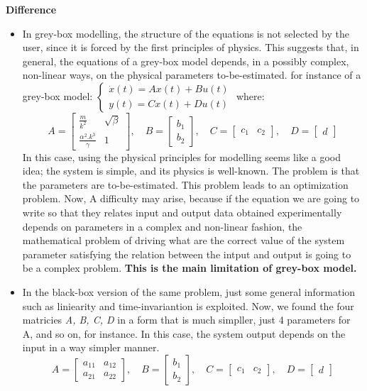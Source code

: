 \textbf{Difference} 
\begin{itemize}
\item In grey-box modelling, the structure of the equations is not selected by the user, since it is forced by the first principles of physics. This suggests that, in general, the equations of a grey-box model depends, in a possibly complex, non-linear ways, on the physical parameters to-be-estimated.\newline
for instance of a grey-box model:
$\begin{cases}
    \dot{x}(t) = A x(t) + B u(t) \\
    y(t) = C x(t) + D u(t)
\end{cases}$ where:
\newline
\[
A = \begin{bmatrix}
\frac{m}{k^2} & \sqrt{\beta} \\
\frac{\alpha^2.k^3}{\gamma} & 1  
\end{bmatrix}, \quad
B = \begin{bmatrix}
b_1 \\
b_2
\end{bmatrix}, \quad
C = \begin{bmatrix}
c_1 & c_2
\end{bmatrix}, \quad
D = \begin{bmatrix}
d
\end{bmatrix}
\]
In this case, using the physical principles for modelling seems like a good idea; the system is simple, and its physics is well-known. The problem is that the parameters are to-be-estimated. This problem leads to an optimization problem. Now, A difficulty may arise, because if the equation we are going to write so that they relates input and output data obtained experimentally depends on parameters in a complex and non-linear fashion, the mathematical problem of driving what are the correct value of the system parameter satisfying the relation between the intput and output is going to be a complex problem. \textbf{This is the main limitation of grey-box model.}

\item In the black-box version of the same problem, just some general information such as liniearity and time-invariantion is exploited. Now, we found the four matricies \textit{A, B, C, D} in a form that is much simpller, just 4 parameters for A, and so on, for instance. In this case, the system output depends on the input in a way simpler manner.
\[
A = \begin{bmatrix}
a_{11} & a_{12} \\
a_{21} & a_{22}  
\end{bmatrix}, \quad
B = \begin{bmatrix} 
b_1 \\
b_2
\end{bmatrix}, \quad
C = \begin{bmatrix}
c_1 & c_2
\end{bmatrix}, \quad
D = \begin{bmatrix}
d
\end{bmatrix}
\]\newline



\end{itemize}
